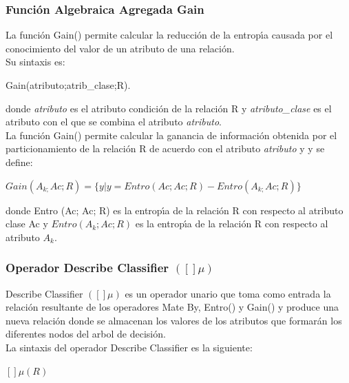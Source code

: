 \subsubsection{Funci\'on Algebraica Agregada Gain}
La funci\'on Gain() permite calcular la reducci\'on de la entrop\'\i{}a causada por el conocimiento del valor de
un atributo de una relaci\'on.\\

Su sintaxis es:\\
\begin{center}
Gain(atributo;atrib\_clase;R).\\
\end{center}

donde \textit{atributo} es el atributo condici\'on de la relaci\'on R y \textit{atributo\_clase} es el atributo
con el que se combina el atributo \textit{atributo}.\\

La funci\'on Gain() permite calcular la ganancia de informaci\'on obtenida por el particionamiento de la
relaci\'on R de acuerdo con el atributo \textit{atributo} y y se define:\\

\begin{center}
$Gain(A_{k;}Ac; R)=\{ y | y = Entro(Ac;Ac; R) - Entro(A_{k;}Ac; R) \} $\\
\end{center}

donde Entro (Ac; Ac; R) es la entrop\'\i{}a de la relaci\'on R con respecto al atributo clase Ac y
$Entro(A_{k};Ac; R)$ es la entrop\'\i{}a de la relaci\'on R con respecto al atributo $A_{k}.$

\subsubsection{Operador Describe Classifier $([]\mu)$}
Describe Classifier $([]\mu)$ es un operador unario que toma como entrada la relaci\'on resultante de los
operadores Mate By, Entro() y Gain() y produce una nueva relaci\'on donde se almacenan los valores de los
atributos que formar\'an los diferentes nodos del arbol de decisi\'on.\\

La sintaxis del operador Describe Classifier es la siguiente:\\

\begin{center}
$ []\mu(R)$\\
\end{center}

